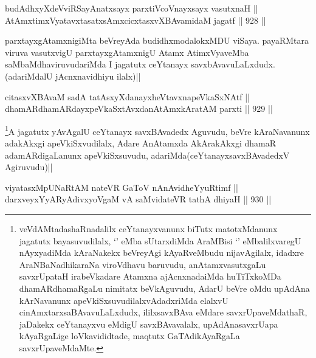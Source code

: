 
\begin{shl}
budAdhxyXdeVviRSayAnatxsayx parxtiVcoV\s nayxsayx vasutxnaH || \\
AtAmxtimxVyatavxtasatxsAmxcicxtasxvXBAvamidaM jagatf ||  928 ||  
\end{shl}

\begin{artha}
parxtayxgAtamxnigiMta beVreyAda budidhxmodalokxMDU viSaya. payaRMtara viruva vasutxvigU parxtayxgAtamxnigU Atamx AtimxVyaveMba saMbaMdhaviruvudariMda I jagatutx ceYtanayx savxbAvavuLaLxdudx.(adariMdalU jAcnxnavidhiyu ilalx)||
\end{artha}


\begin{shl}
citasxvXBAvaM sadA tatAsxyXdanayxheVtavxnapeVkaSxNAtf ||  \\
dhamARdhamARdayxpeVkaSxtAvxdanAtAmxkAratAM parxti ||  929 ||  
\end{shl}

\begin{artha}
\footnote{veVdAMtadashaRnadalilx ceYtanayxvanunx biTutx matotxMdanunx jagatutx bayasuvudilalx, `\stext' eMba sUtarxdiMda AraMBisi `\stext' eMbalilxvaregU nAyxyadiMda kAraNakekx beVreyAgi kAyaRveMbudu nijavAgilalx, idadxre AraNBaNadhikaraNa viroVdhavu baruvudu, anAtamxvasutxgaLu savxrUpataH irabeVkadare Atamxna ajAcnxnadaiMda huTiTxkoMDa dhamARdhamaRgaLu nimitatx beVkAguvudu, AdarU beVre oMdu upAdAna kArNavanunx apeVkiSxsuvudilalxvAdadxriMda elalxvU cinAmxtarxsaBAvavuLaLxdudx, ililxsavxBAva eMdare savxrUpaveMdathaR, jaDakekx ceYtanayxvu eMdigU savxBAvavalalx, upAdAnasavxrUapa kAyaRgaLige loVkavididtade, maqtutx GaTAdikAyaRgaLa savxrUpaveMdaMte.}A jagatutx yAvAgalU ceYtanayx savxBAvadedx Aguvudu, beVre kAraNavanunx adakAkxgi apeVkiSxvudilalx, Adare AnAtamxda AkArakAkxgi dhamaR adamARdigaLanunx apeVkiSxsuvudu, adariMda(ceYtanayxsavxBAvadedxV Agiruvudu)||
\end{artha}


\begin{shl}
viyatasxMpUNaRtAM nateVR GaToV nAnAvidheYyuRtimf || \\
darxveyxYyARyAdivxyoVgaM vA saMvidateVR tathA dhiyaH ||  930 ||  
\end{shl}

